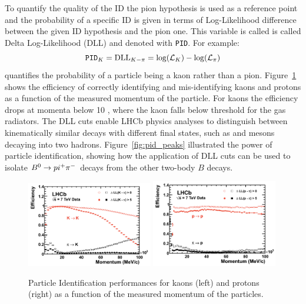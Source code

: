 To quantify the quality of the ID the pion hypothesis is used as a reference point and the probability
of a specific ID is given in terms of  Log-Likelihood difference between the given ID hypothesis and the pion one.
This variable is called is called Delta Log-Likelihood (DLL) and denoted with \verb!PID!.
For example:
\begin{equation}
\verb!PID!_K = \text{DLL}_{K-\pi} = \log(\mathcal{L}_K) - \log(\mathcal{L}_\pi)
\end{equation}
quantifies the probability of a particle being a kaon rather than a pion.
Figure~\ref{fig:pid_perf} shows the efficiency of correctly identifying and mis-identifying kaons and protons
as a function of the measured momentum of the particle. For kaons the efficiency drops at momenta below
10 \gev, where the kaon falls below threshold for the gas radiators. 
The DLL cuts enable LHCb physics analyses to distinguish between kinematically similar decays 
with different final states, such as \Bz and \Bs mesons decaying into two hadrons.
Figure~\ref{fig:pid_peaks} illustrated the power of particle identification,  showing how the application
of DLL cuts can be used to isolate $\Bz\to pi^+\pi^-$ decays from the other two-body $B$ decays.
%
\begin{figure}[h!]
\centering
\includegraphics[width=0.49\textwidth]{Detector/figs/kaon_pid_perf.png}
\includegraphics[width=0.49\textwidth]{Detector/figs/proton_pid_perf.png}
\caption{Particle Identification performances for kaons (left) and protons (right) as a function of the measured momentum of the particles. }
\label{fig:pid_perf}
\end{figure}

